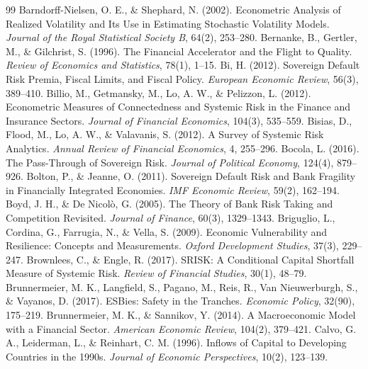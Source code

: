\begin{thebibliography}{99}
 Barndorff-Nielsen, O. E., \& Shephard, N. (2002). Econometric Analysis of Realized Volatility and Its Use in Estimating Stochastic Volatility Models. \textit{Journal of the Royal Statistical Society B}, 64(2), 253--280.
 Bernanke, B., Gertler, M., \& Gilchrist, S. (1996). The Financial Accelerator and the Flight to Quality. \textit{Review of Economics and Statistics}, 78(1), 1--15.
 Bi, H. (2012). Sovereign Default Risk Premia, Fiscal Limits, and Fiscal Policy. \textit{European Economic Review}, 56(3), 389--410.
 Billio, M., Getmansky, M., Lo, A. W., \& Pelizzon, L. (2012). Econometric Measures of Connectedness and Systemic Risk in the Finance and Insurance Sectors. \textit{Journal of Financial Economics}, 104(3), 535--559.
 Bisias, D., Flood, M., Lo, A. W., \& Valavanis, S. (2012). A Survey of Systemic Risk Analytics. \textit{Annual Review of Financial Economics}, 4, 255--296.
 Bocola, L. (2016). The Pass-Through of Sovereign Risk. \textit{Journal of Political Economy}, 124(4), 879--926.
 Bolton, P., \& Jeanne, O. (2011). Sovereign Default Risk and Bank Fragility in Financially Integrated Economies. \textit{IMF Economic Review}, 59(2), 162--194.
 Boyd, J. H., \& De Nicolò, G. (2005). The Theory of Bank Risk Taking and Competition Revisited. \textit{Journal of Finance}, 60(3), 1329--1343.
 Briguglio, L., Cordina, G., Farrugia, N., \& Vella, S. (2009). Economic Vulnerability and Resilience: Concepts and Measurements. \textit{Oxford Development Studies}, 37(3), 229--247.
 Brownlees, C., \& Engle, R. (2017). SRISK: A Conditional Capital Shortfall Measure of Systemic Risk. \textit{Review of Financial Studies}, 30(1), 48--79.
 Brunnermeier, M. K., Langfield, S., Pagano, M., Reis, R., Van Nieuwerburgh, S., \& Vayanos, D. (2017). ESBies: Safety in the Tranches. \textit{Economic Policy}, 32(90), 175--219.
 Brunnermeier, M. K., \& Sannikov, Y. (2014). A Macroeconomic Model with a Financial Sector. \textit{American Economic Review}, 104(2), 379--421.
 Calvo, G. A., Leiderman, L., \& Reinhart, C. M. (1996). Inflows of Capital to Developing Countries in the 1990s. \textit{Journal of Economic Perspectives}, 10(2), 123--139.

\end{thebibliography}
